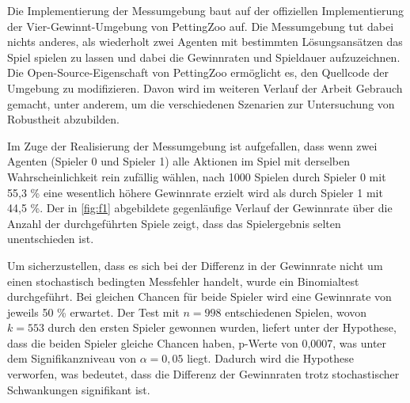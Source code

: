 
Die Implementierung der Messumgebung baut auf der offiziellen Implementierung der Vier-Gewinnt-Umgebung von PettingZoo auf. Die Messumgebung tut dabei nichts anderes, als wiederholt zwei Agenten mit bestimmten Lösungsansätzen das Spiel spielen zu lassen und dabei die Gewinnraten und Spieldauer aufzuzeichnen. Die Open-Source-Eigenschaft von PettingZoo ermöglicht es, den Quellcode der Umgebung zu modifizieren. Davon wird im weiteren Verlauf der Arbeit Gebrauch gemacht, unter anderem, um die verschiedenen Szenarien zur Untersuchung von Robustheit abzubilden.

Im Zuge der Realisierung der Messumgebung ist aufgefallen, dass wenn zwei Agenten (Spieler 0 und Spieler 1) alle Aktionen im Spiel mit derselben Wahrscheinlichkeit rein zufällig wählen, nach 1000 Spielen durch Spieler 0 mit 55,3 \% eine wesentlich höhere Gewinnrate erzielt wird als durch Spieler 1 mit 44,5 \%. Der in \ref{fig:f1} abgebildete gegenläufige Verlauf der Gewinnrate über die Anzahl der durchgeführten Spiele zeigt, dass das Spielergebnis selten unentschieden ist.

Um sicherzustellen, dass es sich bei der Differenz in der Gewinnrate nicht um einen stochastisch bedingten Messfehler handelt, wurde ein Binomialtest durchgeführt. Bei gleichen Chancen für beide Spieler wird eine Gewinnrate von jeweils 50 \% erwartet. Der Test mit $n = 998$ entschiedenen Spielen, wovon $k = 553$ durch den ersten Spieler gewonnen wurden, liefert unter der Hypothese, dass die beiden Spieler gleiche Chancen haben, p-Werte von 0,0007, was unter dem Signifikanzniveau von $\alpha = 0,05$ liegt. Dadurch wird die Hypothese verworfen, was bedeutet, dass die Differenz der Gewinnraten trotz stochastischer Schwankungen signifikant ist.

